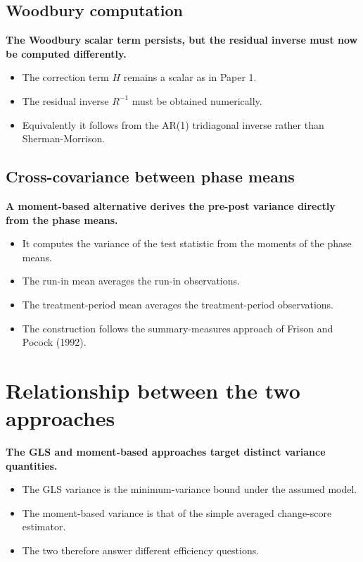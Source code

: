 \documentclass[
  11pt,
]{article}
\begin{document}
\subsection{Woodbury computation}\label{woodbury-computation}

\textbf{The Woodbury scalar term persists, but the residual inverse must now be computed differently.}

\begin{itemize}\setlength{\itemsep}{2pt}\setlength{\parskip}{0pt}
\item The correction term $H$ remains a scalar as in Paper 1.
\item The residual inverse $R^{-1}$ must be obtained numerically.
\item Equivalently it follows from the AR(1) tridiagonal inverse rather than Sherman-Morrison.
\end{itemize}

\subsection{Cross-covariance between phase means}\label{cross-covariance-between-phase-means}

\textbf{A moment-based alternative derives the pre-post variance directly from the phase means.}

\begin{itemize}\setlength{\itemsep}{2pt}\setlength{\parskip}{0pt}
\item It computes the variance of the test statistic from the moments of the phase means.
\item The run-in mean averages the run-in observations.
\item The treatment-period mean averages the treatment-period observations.
\item The construction follows the summary-measures approach of Frison and Pocock (1992).
\end{itemize}

\section{Relationship between the two approaches}\label{relationship-between-the-two-approaches}

\textbf{The GLS and moment-based approaches target distinct variance quantities.}

\begin{itemize}\setlength{\itemsep}{2pt}\setlength{\parskip}{0pt}
\item The GLS variance is the minimum-variance bound under the assumed model.
\item The moment-based variance is that of the simple averaged change-score estimator.
\item The two therefore answer different efficiency questions.
\end{itemize}
\end{document}
